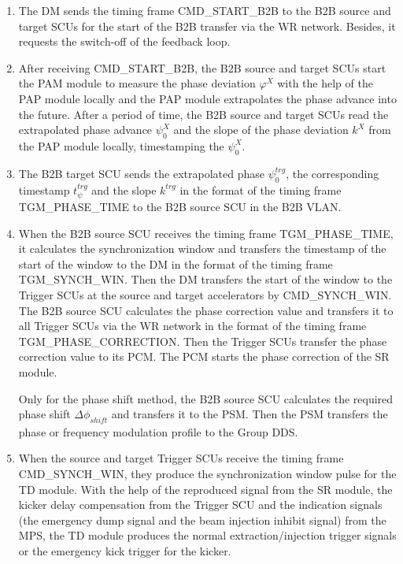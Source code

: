 \begin{enumerate}
\item The DM sends the timing frame CMD\_START\_B2B to the B2B source and target SCUs for the start of the B2B transfer via the WR network. Besides, it requests the switch-off of the feedback loop.

\item  After receiving CMD\_START\_B2B, the B2B source and target SCUs start the PAM module to measure the phase deviation $\varphi^X$ with the help of the PAP module locally and the PAP module extrapolates the phase advance into the future. After a period of time, the B2B source and target SCUs read the extrapolated phase advance $\psi^X_0$ and the slope of the phase deviation $k^\mathit{X}$ from the PAP module locally, timestamping the $\psi^X_0$.  

\item  The B2B target SCU sends the extrapolated phase $\psi^\mathit{trg}_0$, the corresponding timestamp $t_\psi^\mathit{trg}$ and the slope $k^\mathit{trg}$ in the format of the timing frame TGM\_PHASE\_TIME to the B2B source SCU in the B2B VLAN. 

\item  When the B2B source SCU receives the timing frame TGM\_PHASE\_TIME, it calculates the synchronization window and transfers the timestamp of the start of the window to the DM in the format of the timing frame TGM\_SYNCH\_WIN. Then the DM transfers the start of the window to the Trigger SCUs at the source and target accelerators by CMD\_SYNCH\_WIN.
The B2B source SCU calculates the phase correction value and transfers it to all Trigger SCUs via the WR network in the format of the timing frame TGM\_PHASE\_CORRECTION. Then the Trigger SCUs transfer the phase correction value to its \gls{PCM}. The PCM starts the phase correction of the SR module. 

Only for the phase shift method, the B2B source SCU calculates the required phase shift $\Delta \phi_\mathit{shift}$ and transfers it to the PSM. Then the PSM transfers the phase or frequency modulation profile to the Group DDS.  

\item  When the source and target Trigger SCUs receive the timing frame CMD\_SYNCH\_WIN, they produce the synchronization window pulse for the TD module. With the help of the reproduced signal from the SR module, the kicker delay compensation from the Trigger SCU and the indication signals (the emergency dump signal and the beam injection inhibit signal) from the MPS, the TD module produces the normal extraction/injection trigger signals or the emergency kick trigger for the kicker.  


\end{enumerate}
